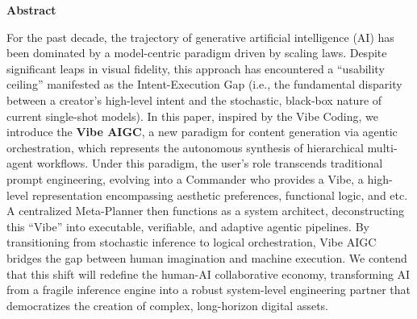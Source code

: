 \begin{abstractbox}
\begin{center}
\textbf{\Large Abstract}
\end{center}
For the past decade, the trajectory of generative artificial intelligence (AI) has been dominated by a model-centric paradigm driven by scaling laws. Despite significant leaps in visual fidelity, this approach has encountered a ``usability ceiling'' manifested as the Intent-Execution Gap (i.e., the fundamental disparity between a creator's high-level intent and the stochastic, black-box nature of current single-shot models). In this paper, 
inspired by the Vibe Coding, we introduce the \textbf{Vibe AIGC}, a new paradigm for content generation via agentic orchestration, which represents the autonomous synthesis of hierarchical multi-agent workflows. 
Under this paradigm, the user's role transcends traditional prompt engineering, evolving into a Commander who provides a Vibe, a high-level representation encompassing aesthetic preferences, functional logic, and etc. A centralized Meta-Planner then functions as a system architect, deconstructing this ``Vibe'' into executable, verifiable, and adaptive agentic pipelines. By transitioning from stochastic inference to logical orchestration, Vibe AIGC bridges the gap between human imagination and machine execution. We contend that this shift will redefine the human-AI collaborative economy, transforming AI from a fragile inference engine into a robust system-level engineering partner that democratizes the creation of complex, long-horizon digital assets.
\end{abstractbox}


